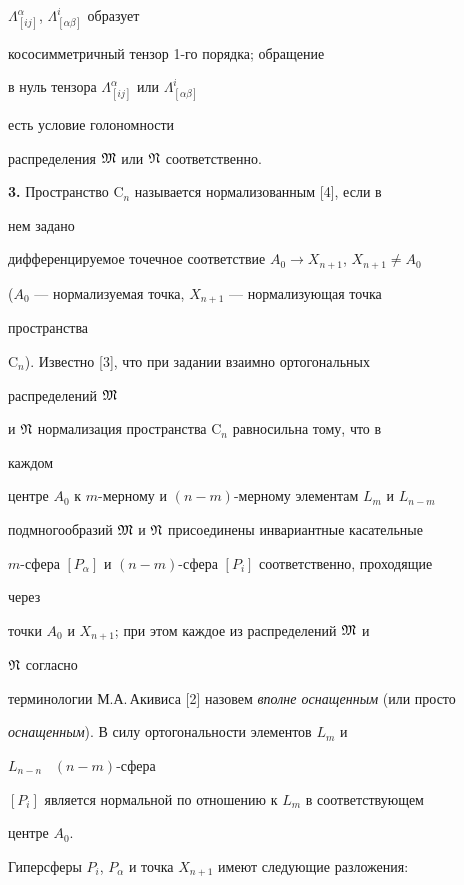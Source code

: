 $\Lambda^\alpha_{[i j]}$, $\Lambda^i_{[\alpha\beta]}$ образует 


кососимметричный тензор 1-го порядка; обращение 


в нуль тензора $\Lambda^\alpha_{[i j]}$ или $\Lambda^i_{[\alpha\beta]}$ 


есть условие голономности 


распределения $\frak M$ или $\frak N$ соответственно. 


\medskip 


 


{\bf 3.} Пространство $\mathrm C_n$ называется нормализованным [4], если в 


нем задано 


дифференцируемое точечное соответствие $A_0\to X_{n+1}$, $X_{n+1}\ne 


A_0$ 


($A_0$ --- нормализуемая точка, $X_{n+1}$ --- нормализующая точка 


пространства 


$\mathrm C_n$). Известно [3], что при задании взаимно ортогональных 


распределений $\frak M$ 


и $\frak N$ нормализация пространства $\mathrm C_n$ равносильна тому, что в 


каждом 


центре $A_0$ к $m$-мерному и $(n-m)$-мерному элементам $L_m$ и $L_{n-m}$ 


подмногообразий $\frak M$ и $\frak N$ присоединены инвариантные касательные 


$m$-сфера $[P_\alpha]$ и $(n-m)$-сфера $[P_i]$ соответственно, проходящие 


через 


точки $A_0$ и $X_{n+1}$; при этом каждое из распределений $\frak M$ и 


$\frak N$ согласно 


терминологии М.А.\,Акивиса [2] назовем {\it вполне оснащенным} (или просто 


{\it оснащенным}). В силу ортогональности элементов $L_m$ и 


$L_{n-n}$ \ $(n-m)$-сфера 


$[P_i]$ является нормальной по отношению к $L_m$ в соответствующем 


центре $A_0$. 


 


Гиперсферы $P_i$, $P_\alpha$ и точка $X_{n+1}$ имеют следующие разложения: 


